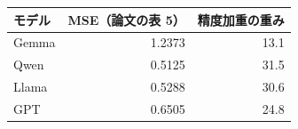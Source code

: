\begin{tabular}{lrr}
\toprule
モデル & MSE（論文の表 5） & 精度加重の重み \\
\midrule
Gemma & 1.2373 & 13.1 \\
Qwen & 0.5125 & 31.5 \\
Llama & 0.5288 & 30.6 \\
GPT & 0.6505 & 24.8 \\
\bottomrule
\end{tabular}
